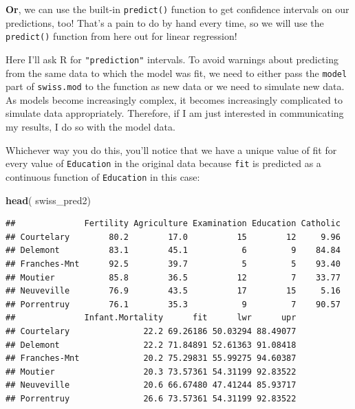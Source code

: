 \documentclass[
]{book}
\newenvironment{Shaded}{\begin{snugshade}}{\end{snugshade}}
\newcommand{\CommentTok}[1]{\textcolor[rgb]{0.56,0.35,0.01}{\textit{#1}}}
\newcommand{\DataTypeTok}[1]{\textcolor[rgb]{0.13,0.29,0.53}{#1}}
\newcommand{\KeywordTok}[1]{\textcolor[rgb]{0.13,0.29,0.53}{\textbf{#1}}}
\newcommand{\NormalTok}[1]{#1}
\newcommand{\OperatorTok}[1]{\textcolor[rgb]{0.81,0.36,0.00}{\textbf{#1}}}
\newcommand{\StringTok}[1]{\textcolor[rgb]{0.31,0.60,0.02}{#1}}
\begin{document}
\textbf{Or}, we can use the built-in \texttt{predict()} function to get confidence intervals on our predictions, too! That's a pain to do by hand every time, so we will use the \texttt{predict()} function from here out for linear regression!

Here I'll ask R for \texttt{"prediction"} intervals. To avoid warnings about predicting from the same data to which the model was fit, we need to either pass the \texttt{model} part of \texttt{swiss.mod} to the function as new data or we need to simulate new data. As models become increasingly complex, it becomes increasingly complicated to simulate data appropriately. Therefore, if I am just interested in communicating my results, I do so with the model data.

\begin{Shaded}
\end{Shaded}

Whichever way you do this, you'll notice that we have a unique value of fit for every value of \texttt{Education} in the original data because \texttt{fit} is predicted as a continuous function of \texttt{Education} in this case:

\begin{Shaded}
\begin{Highlighting}[]
\KeywordTok{head}\NormalTok{( swiss_pred2)}
\end{Highlighting}
\end{Shaded}

\begin{verbatim}
##              Fertility Agriculture Examination Education Catholic
## Courtelary        80.2        17.0          15        12     9.96
## Delemont          83.1        45.1           6         9    84.84
## Franches-Mnt      92.5        39.7           5         5    93.40
## Moutier           85.8        36.5          12         7    33.77
## Neuveville        76.9        43.5          17        15     5.16
## Porrentruy        76.1        35.3           9         7    90.57
##              Infant.Mortality      fit      lwr      upr
## Courtelary               22.2 69.26186 50.03294 88.49077
## Delemont                 22.2 71.84891 52.61363 91.08418
## Franches-Mnt             20.2 75.29831 55.99275 94.60387
## Moutier                  20.3 73.57361 54.31199 92.83522
## Neuveville               20.6 66.67480 47.41244 85.93717
## Porrentruy               26.6 73.57361 54.31199 92.83522
\end{verbatim}
\end{document}
